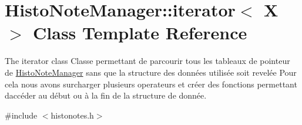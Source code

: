 \hypertarget{class_histo_note_manager_1_1iterator}{}\section{Histo\+Note\+Manager\+:\+:iterator$<$ X $>$ Class Template Reference}
\label{class_histo_note_manager_1_1iterator}


The iterator class Classe permettant de parcourir tous les tableaux de pointeur de \hyperlink{class_histo_note_manager}{Histo\+Note\+Manager} sans que la structure des données utilisée soit revelée Pour cela nous avons surcharger plusieurs operateurs et créer des fonctions permettant d\textquotesingle{}accéder au début ou à la fin de la structure de donnée.  




{\ttfamily \#include $<$histonotes.\+h$>$}

